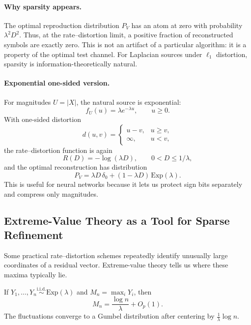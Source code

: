 \paragraph{Why sparsity appears.}
The optimal reproduction distribution $P_V$ has an atom at zero with probability $\lambda^2D^2$.
Thus, at the rate--distortion limit, a positive fraction of reconstructed symbols are exactly zero.
This is not an artifact of a particular algorithm: it is a property of the optimal test channel.
For Laplacian sources under $\ell_1$ distortion, sparsity is information-theoretically natural.

\paragraph{Exponential one-sided version.}
For magnitudes $U=|X|$, the natural source is exponential:
\[
    f_U(u)=\lambda e^{-\lambda u},\qquad u\ge 0.
\]
With one-sided distortion
\[
    d(u,v)=
    \begin{cases}
    u-v, & u\ge v,\\
    \infty, & u<v,
    \end{cases}
\]
the rate--distortion function is again
\begin{equation}
    R(D)=-\log(\lambda D),\qquad 0<D\le 1/\lambda,
\end{equation}
and the optimal reconstruction has distribution
\begin{equation}
    P_V=\lambda D\,\delta_0+(1-\lambda D)\,\mathrm{Exp}(\lambda).
\end{equation}
This is useful for neural networks because it lets us protect sign bits separately and compress only magnitudes.

\subsection{Extreme-Value Theory as a Tool for Sparse Refinement}
\label{sec:evt}

Some practical rate--distortion schemes repeatedly identify unusually large coordinates of a residual vector.
Extreme-value theory tells us where these maxima typically lie.

\begin{example}
If $Y_1,\dots,Y_n\overset{\text{i.i.d.}}{\sim}\mathrm{Exp}(\lambda)$ and $M_n=\max_i Y_i$, then
\begin{equation}
    M_n = \frac{\log n}{\lambda} + O_p(1).
\end{equation}
The fluctuations converge to a Gumbel distribution after centering by $\frac{1}{\lambda}\log n$.
\end{example}

